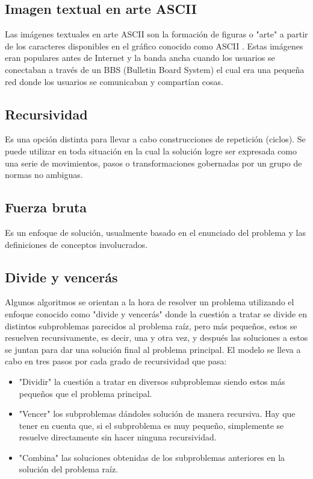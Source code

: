\documentclass[12pt,twoside]{article}
\begin{document}
        \subsection{Imagen textual en arte ASCII}
        Las im\'agenes textuales en arte ASCII son la formaci\'on de figuras o "arte" a partir de los caracteres disponibles en el gr\'afico conocido como ASCII . Estas im\'agenes eran populares antes de Internet y la banda ancha cuando los usuarios se conectaban a través de un BBS (Bulletin Board System) el cual era una pequeña red donde los usuarios se comunicaban y compartían cosas.
        
        \subsection{Recursividad}
        Es una opci\'on distinta para llevar a cabo construcciones de repetici\'on (ciclos). Se puede utilizar en toda situaci\'on en la cual la soluci\'on logre ser expresada como una serie de movimientos, pasos o transformaciones gobernadas por un grupo de normas no ambiguas.
        
        \subsection{Fuerza bruta}
        Es un enfoque de soluci\'on, usualmente basado en el enunciado del problema y las definiciones de conceptos involucrados.
        \subsection{Divide y vencer\'as}
        Algunos algoritmos se orientan a la hora de resolver un problema utilizando el enfoque conocido como "divide y vencerás" donde la cuestión a tratar se divide en distintos subproblemas parecidos al problema raíz, pero más pequeños, estos se resuelven recursivamente, es decir, una y otra vez, y después las soluciones a estos se juntan para dar una solución final al problema principal.
        El modelo se lleva a cabo en tres pasos por cada grado de recursividad que pasa:
       \begin{itemize}
        \item "Dividir" la cuestión a tratar en diversos subproblemas siendo estos más pequeños que el problema principal.
        \item "Vencer" los subproblemas dándoles solución de manera recursiva. Hay que tener en cuenta que, si el subproblema es muy pequeño, simplemente se resuelve directamente sin hacer ninguna recursividad.
        \item "Combina" las soluciones obtenidas de los subproblemas anteriores en la solución del problema raíz.
        \end{itemize}
        
\end{document}
